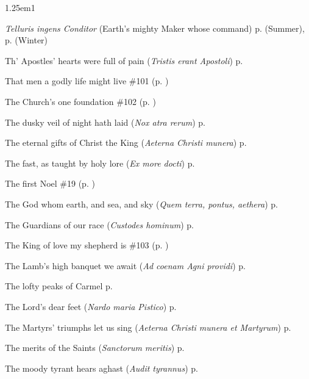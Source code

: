 \begin{hangparas}{1.25em}{1}
\par\noindent
\textit{Telluris ingens Conditor} (Earth's mighty Maker whose command) \dotfill p. \pageref{TuesdayEvensongSummer} (Summer), p. \pageref{TuesdayEvensongWinter} (Winter)
\par\noindent
Th' Apostles' hearts were full of pain (\textit{Tristis erant Apostoli}) \dotfill p. \pageref{ApostlesEvensongEaster}
\par\noindent
That men a godly life might live \dotfill \#101 (p. \pageref{Hymn101})
\par\noindent
The Church's one foundation \dotfill \#102 (p. \pageref{Hymn102})
\par\noindent
The dusky veil of night hath laid (\textit{Nox atra rerum}) \dotfill p. \pageref{ThursdayInvitatory}
\par\noindent
The eternal gifts of Christ the King (\textit{Aeterna Christi munera}) \dotfill p. \pageref{ApostlesInvitatory}
\par\noindent
The fast, as taught by holy lore (\textit{Ex more docti}) \dotfill p. \pageref{FirstLentInvitatoryHymn}
\par\noindent
The first Noel \dotfill \#19 (p. \pageref{Hymn19})
\par\noindent
The God whom earth, and sea, and sky (\textit{Quem terra, pontus, aethera}) \dotfill p. \pageref{BVMInvitatory}
\par\noindent
The Guardians of our race (\textit{Custodes hominum}) \dotfill p. \pageref{GuardianAngelsEvensong}
\par\noindent
The King of love my shepherd is \dotfill \#103 (p. \pageref{Hymn103})
\par\noindent
The Lamb's high banquet we await (\textit{Ad coenam Agni providi}) \dotfill p. \pageref{EasterDayEvensong}
\par\noindent
The lofty peaks of Carmel \dotfill p. \pageref{EliasIEvensong}
\par\noindent
The Lord's dear feet (\textit{Nardo maria Pistico}) \dotfill p. \pageref{MaryMagdaleneInvitatory}
\par\noindent
The Martyrs' triumphs let us sing (\textit{Aeterna Christi munera et Martyrum}) \dotfill p. \pageref{MartyrsInvitatory}
\par\noindent
The merits of the Saints (\textit{Sanctorum meritis}) \dotfill p. \pageref{MartyrsEvensong}
\par\noindent
The moody tyrant hears aghast (\textit{Audit tyrannus}) \dotfill p. \pageref{HolyInnocentsInvitatoryHymn}
\par\noindent

\end{hangparas}
